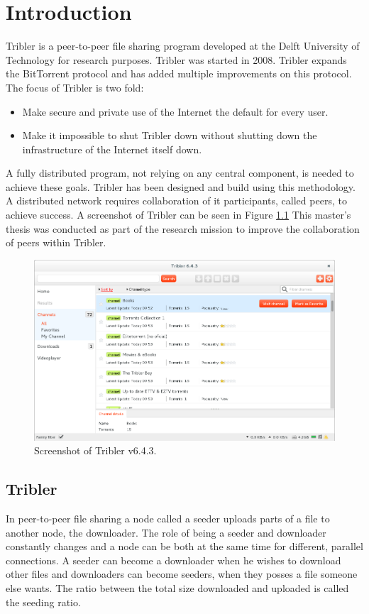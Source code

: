 \chapter{Introduction}
\label{chp:introduction}
Tribler is a peer-to-peer file sharing program developed at the Delft University of Technology for research purposes.
Tribler was started in 2008.
Tribler expands the BitTorrent protocol and has added multiple improvements on this protocol.
The focus of Tribler is two fold:
\begin{itemize}
    \item Make secure and private use of the Internet the default for every user.
    \item Make it impossible to shut Tribler down without shutting down the infrastructure of the Internet itself down.
\end{itemize}

A fully distributed program, not relying on any central component, is needed to achieve these goals.
Tribler has been designed and build using this methodology\cite{Pouwelse-tribler}\cite{Bakker-tribler}.
A distributed network requires collaboration of it participants, called peers, to achieve success.
A screenshot of Tribler can be seen in Figure \ref{fig:tribler-screenshot}
This master's thesis was conducted as part of the research mission to improve the collaboration of peers within Tribler.

\begin{figure}
	\centerline{\includegraphics[scale=0.3]{introduction/figs/tribler-screenshot.png}}
	\caption{Screenshot of Tribler v6.4.3.}
	\label{fig:tribler-screenshot}
\end{figure}

\section{Tribler}
In peer-to-peer file sharing a node called a seeder uploads parts
of a file to another node, the downloader.
The role of being a seeder and downloader constantly changes
and a node can be both at the same time for different, parallel connections.
A seeder can become a downloader when he wishes to download other files
and downloaders can become seeders,
when they posses a file someone else wants.
The ratio between the total size downloaded and uploaded is called the seeding ratio\cite{Cohen-bittorrent}.

